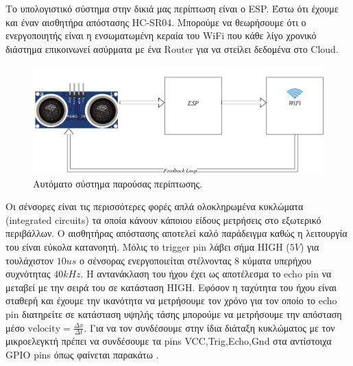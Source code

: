 Το υπολογιστικό σύστημα στην δικιά μας περίπτωση είναι ο ESP. Έστω ότι έχουμε και έναν
αισθητήρα απόστασης HC-SR04. Μπορούμε να θεωρήσουμε ότι ο ενεργοποιητής
είναι η ενσωματωμένη κεραία του WiFi που κάθε λίγο χρονικό διάστημα επικοινωνεί ασύρματα
με ένα Router για να στείλει δεδομένα στο Cloud. 

\begin{figure}[h!]
\centering
\includegraphics[scale=0.4]{images/introduction/thesis_as.png}
\caption{Αυτόματο σύστημα παρούσας περίπτωσης.}
 \label{fig:thesis_as}
\end{figure}

Οι σένσορες είναι τις περισσότερες φορές απλά ολοκληρωμένα κυκλώματα
(integrated circuits) τα οποία κάνουν κάποιου είδους μετρήσεις στο
εξωτερικό περιβάλλων. Ο αισθητήρας απόστασης αποτελεί καλό παράδειγμα
καθώς η λειτουργία του είναι εύκολα κατανοητή. Μόλις το trigger pin
λάβει σήμα HIGH ($5V$) για τουλάχιστον $10us$ ο σένσορας ενεργοποιείται
στέλνοντας 8 κύματα υπερήχου συχνότητας $40kHz$. Η αντανάκλαση του
ήχου έχει ως αποτέλεσμα το echo pin να μεταβεί με την σειρά του σε
κατάσταση HIGH. Εφόσον η ταχύτητα του ήχου είναι σταθερή και έχουμε την ικανότητα
να μετρήσουμε τον χρόνο για τον οποίο το echo pin διατηρείτε σε κατάσταση υψηλής
τάσης μπορούμε να μετρήσουμε την απόσταση μέσο $\text{velocity}= \frac{Δx}{Δt}$.
Για να τον συνδέσουμε στην ίδια διάταξη κυκλώματος με τον μικροελεγκτή πρέπει
να συνδέσουμε τα pins VCC,Trig,Echo,Gnd στα αντίστοιχα GPIO pins όπως φαίνεται
παρακάτω .

